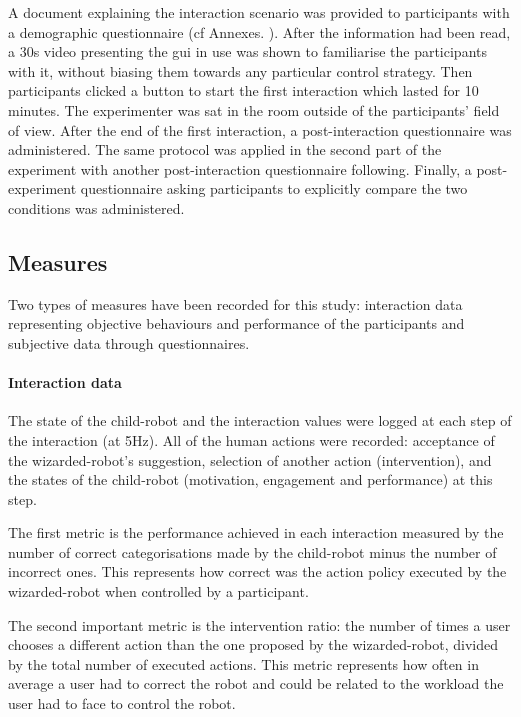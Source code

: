 A document explaining the interaction scenario was provided to participants with a demographic questionnaire (cf Annexes. ). After the information had been read, a 30s video presenting the \gls{gui} in use was shown to familiarise the participants with it, without biasing them towards any particular control strategy. Then participants clicked a button to start the first interaction which lasted for 10 minutes. The experimenter was sat in the room outside of the participants' field of view. After the end of the first interaction, a post-interaction questionnaire was administered. The same protocol was applied in the second part of the experiment with another post-interaction questionnaire following. Finally, a post-experiment questionnaire asking participants to explicitly compare the two conditions was administered.

\subsection{Measures}

Two types of measures have been recorded for this study: interaction data representing objective behaviours and performance of the participants and subjective data through questionnaires.

\paragraph{Interaction data}

The state of the child-robot and the interaction values were logged at each step of the interaction (at 5Hz). All of the human actions were recorded: acceptance of the wizarded-robot's suggestion, selection of another action (intervention), and the states of the child-robot (motivation, engagement and performance) at this step. 

The first metric is the performance achieved in each interaction measured by the number of correct categorisations made by the child-robot minus the number of incorrect ones. This represents how correct was the action policy executed by the wizarded-robot when controlled by a participant.

The second important metric is the intervention ratio: the number of times a user chooses a different action than the one proposed by the wizarded-robot, divided by the total number of executed actions. This metric represents how often in average a user had to correct the robot and could be related to the workload the user had to face to control the robot.


